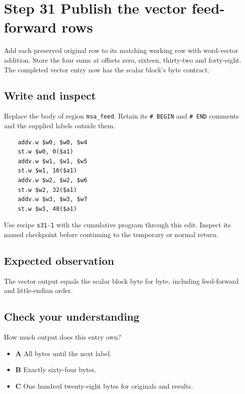 \section{Step 31 Publish the vector feed-forward rows}\label{chacha-s31}

Add each preserved original row to its matching working row with word-vector addition. Store the four sums at offsets zero, sixteen, thirty-two and forty-eight. The completed vector entry now has the scalar block's byte contract.

\subsection{Write and inspect}
Replace the body of region \texttt{msa\_feed}. Retain its \texttt{\# BEGIN} and \texttt{\# END} comments and the supplied labels outside them.

\begin{verbatim}
    addv.w $w0, $w0, $w4
    st.w $w0, 0($a1)
    addv.w $w1, $w1, $w5
    st.w $w1, 16($a1)
    addv.w $w2, $w2, $w6
    st.w $w2, 32($a1)
    addv.w $w3, $w3, $w7
    st.w $w3, 48($a1)
\end{verbatim}

Use recipe \texttt{s31-1} with the cumulative program through this edit. Inspect its named checkpoint before continuing to the temporary or normal return.

\subsection{Expected observation}
The vector output equals the scalar block byte for byte, including feed-forward and little-endian order.

\subsection{Check your understanding}
How much output does this entry own?

\begin{itemize}
\item \textbf{A} All bytes until the next label.
\item \textbf{B} Exactly sixty-four bytes.
\item \textbf{C} One hundred twenty-eight bytes for originals and results.
\end{itemize}
